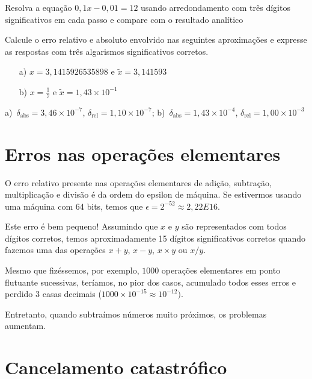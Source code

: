 \begin{exer} Resolva a equação $0,1x-0,01=12$ usando arredondamento com três dígitos significativos em cada passo e compare com o resultado analítico
\end{exer}


\begin{exer} Calcule o erro relativo e absoluto envolvido nas seguintes aproximações e expresse as respostas com três algarismos significativos corretos.
    \begin{itemize}
    \item [a)] $x=3,1415926535898$ e $\tilde{x}=3,141593$
    \item [b)] $x=\frac{1}{7}$ e $\tilde{x}=1,43\times 10^{-1}$
    \end{itemize}
\end{exer}
\begin{resp}
  
    a)~$\delta_{\mbox{abs}}=3,46\times 10^{-7}$, $\delta_{\mbox{rel}}=1,10\times 10^{-7}$; b)~$\delta_{\mbox{abs}}=1,43\times 10^{-4}$, $\delta_{\mbox{rel}} = 1,00 \times 10^{-3}$
  
\end{resp}



\section{Erros nas operações elementares}
O erro relativo presente nas operações elementares de adição, subtração, multiplicação e divisão é da ordem do epsilon de máquina. Se estivermos usando uma máquina com 64 bits, temos que $\epsilon = 2^{-52} \approx 2,22E16$. 

Este erro é bem pequeno! Assumindo que $x$ e $y$ são representados com todos dígitos corretos, temos aproximadamente 15 dígitos significativos corretos quando fazemos uma das operações $x+y$, $x-y$, $x\times y$ ou $x/y$. 


Mesmo que fizéssemos, por exemplo, $1000$ operações elementares em ponto flutuante sucessivas, teríamos, no pior dos casos, acumulado todos esses erros e perdido $3$ casas decimais ($1000\times 10^{-15} \approx 10^{-12})$.

Entretanto, quando subtraímos números muito próximos, os problemas aumentam.

\section{Cancelamento catastrófico}

